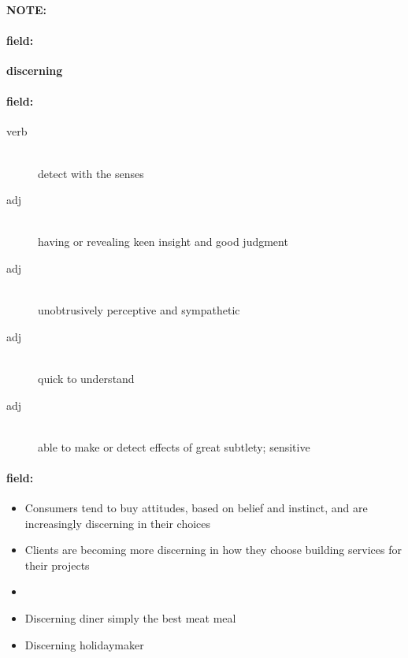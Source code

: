\documentclass[12pt]{article}
\newenvironment{note}{\paragraph{NOTE:}}{}
\newenvironment{field}{\paragraph{field:}}{}
\begin{document}
\begin{note}
\begin{field}
\textbf{\large discerning}
\end{field}


\begin{field}
\begin{description}
\item[verb] \hfill \\ 
detect with the senses

\item[adj] \hfill \\ 
having or revealing keen insight and good judgment

\item[adj] \hfill \\ 
unobtrusively perceptive and sympathetic

\item[adj] \hfill \\ 
quick to understand

\item[adj] \hfill \\ 
able to make or detect effects of great subtlety; sensitive

\end{description}
\end{field}

\begin{field}
\begin{itemize}
\item Consumers tend to buy attitudes, based on belief and instinct, and are increasingly discerning in their choices
\item Clients are becoming more discerning in how they choose building services for their projects
\item 
\item Discerning diner simply the best meat meal
\item Discerning holidaymaker
\end{itemize}
\end{field}
\end{note}
\end{document}
